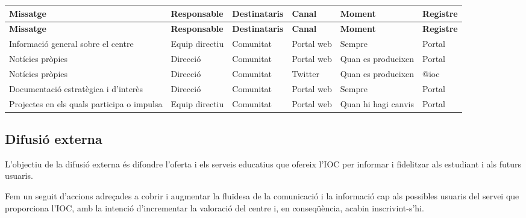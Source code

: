 \documentclass[fontsize=10pt,%
paper=a4,%
DIV=14,%
twoside=semi,%
pagesize=auto,%
parskip=half,
captions=tableheading,%
numbers=noenddot,%
toc=graduated%
]{scrartcl}
\renewcommand{\arraystretch}{1.75}%
\renewcommand{\arraystretch}{1.75}%
\begin{document}
\small{
\setlength{\tabcolsep}{10pt}
\renewcommand{\arraystretch}{1.5}
\begin{longtable}{p{3cm}p{2cm}p{2cm}p{1.5cm}p{2cm}p{1.5cm}}
\hline
\textbf{Missatge}                          & \textbf{Responsable} & \textbf{Destinataris} & \textbf{Canal} & \textbf{Moment}     & \textbf{Registre} \\
\hline \endfirsthead
\hline
\textbf{Missatge}                          & \textbf{Responsable} & \textbf{Destinataris} & \textbf{Canal} & \textbf{Moment}     & \textbf{Registre} \\
\hline \endhead
Informació general sobre el centre         & Equip directiu       & Comunitat             & Portal web     & Sempre              & Portal            \\
Notícies pròpies                           & Direcció             & Comunitat             & Portal web     & Quan es produeixen  & Portal            \\
Notícies pròpies                           & Direcció             & Comunitat             & Twitter        & Quan es produeixen  & @ioc              \\
Documentació estratègica i d'interès       & Direcció             & Comunitat             & Portal web     & Sempre              & Portal            \\
Projectes en els quals participa o impulsa & Equip directiu       & Comunitat             & Portal web     & Quan hi hagi canvis & Portal            \\
\end{longtable}
}%

\subsection{Difusió externa}

L'objectiu de la difusió externa és difondre l'oferta i els serveis educatius que ofereix l'IOC per informar i fidelitzar als estudiant i als futurs usuaris. 

Fem un seguit d'accions adreçades a cobrir i augmentar la fluïdesa de la comunicació i la informació cap als possibles usuaris del servei que proporciona l'IOC, amb la intenció d'incrementar la valoració del centre i, en conseqüència, acabin inscrivint-s'hi.
\end{document}
